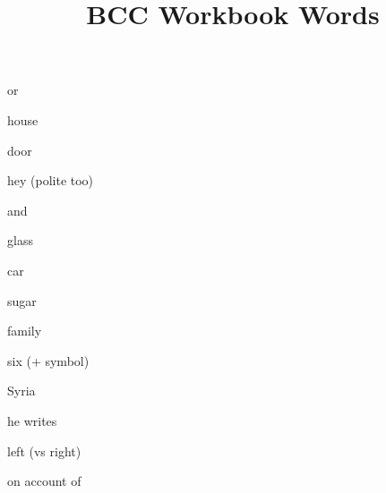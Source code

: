 \documentclass[avery5371,grid,frame]{flashcards}
\title{BCC Workbook Words}
\begin{document}
\begin{flashcard}{\LARGE or}
\LARGE {}
\end{flashcard}
\begin{flashcard}{\LARGE house}
\LARGE {}
\end{flashcard}
\begin{flashcard}{\LARGE door}
\LARGE {}
\end{flashcard}
\begin{flashcard}{\LARGE hey (polite too)}
\LARGE {}
\end{flashcard}
\begin{flashcard}{\LARGE and}
\LARGE {}
\end{flashcard}
\begin{flashcard}{\LARGE glass}
\LARGE {}
\end{flashcard}
\begin{flashcard}{\LARGE car}
\LARGE {}
\end{flashcard}
\begin{flashcard}{\LARGE sugar}
\LARGE {}
\end{flashcard}
\begin{flashcard}{\LARGE family}
\LARGE {}
\end{flashcard}
\begin{flashcard}{\LARGE six (+ symbol)}
\LARGE {}
\end{flashcard}
\begin{flashcard}{\LARGE Syria}
\LARGE {}
\end{flashcard}
\begin{flashcard}{\LARGE he writes}
\LARGE {}
\end{flashcard}
\begin{flashcard}{\LARGE left (vs right)}
\LARGE {}
\end{flashcard}
\begin{flashcard}{\LARGE on account of}
\LARGE {}
\end{flashcard}
\end{document}
